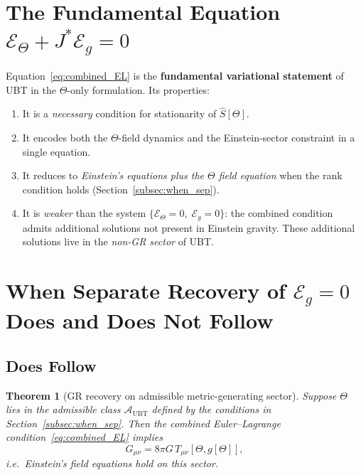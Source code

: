 \documentclass[12pt]{article}
\newtheorem{theorem}{Theorem}[section]
\theoremstyle{definition}
\theoremstyle{remark}
\begin{document}
\section{The Fundamental Equation $\mathcal{E}_\Theta + J^*\mathcal{E}_g = 0$}
\label{sec:fundamental_equation}

Equation~\eqref{eq:combined_EL} is the \textbf{fundamental variational
statement} of UBT in the $\Theta$-only formulation.  Its properties:

\begin{enumerate}
  \item It is a \emph{necessary} condition for stationarity of $\hat{S}[\Theta]$.
  \item It encodes both the $\Theta$-field dynamics and the Einstein-sector
    constraint in a single equation.
  \item It reduces to \emph{Einstein's equations plus the $\Theta$ field
    equation} when the rank condition holds (Section~\ref{subsec:when_sep}).
  \item It is \emph{weaker} than the system
    $\{\mathcal{E}_\Theta = 0,\; \mathcal{E}_g = 0\}$:
    the combined condition admits additional solutions not present in
    Einstein gravity.  These additional solutions live in the
    \emph{non-GR sector} of UBT.
\end{enumerate}

\section{When Separate Recovery of $\mathcal{E}_g = 0$ Does and Does Not Follow}
\label{sec:recovery}

\subsection{Does Follow}

\begin{theorem}[GR recovery on admissible metric-generating sector]
\label{thm:gr_recovery}
Suppose $\Theta$ lies in the admissible class $\mathcal{A}_{\mathrm{UBT}}$ defined
by the conditions in \textup{Section~\ref{subsec:when_sep}}.  Then the combined
Euler--Lagrange condition~\eqref{eq:combined_EL} implies
\begin{equation}
  G_{\mu\nu} = 8\pi G\, T_{\mu\nu}[\Theta, g[\Theta]],
  \label{eq:einstein}
\end{equation}
i.e.\ Einstein's field equations hold on this sector.
\end{theorem}
\end{document}
